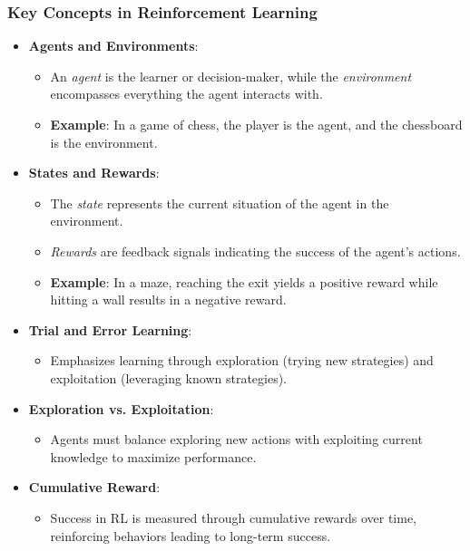 \documentclass{beamer}
\begin{document}
\begin{frame}[fragile]
    \frametitle{Key Concepts in Reinforcement Learning}
    \begin{itemize}
        \item \textbf{Agents and Environments}:
        \begin{itemize}
            \item An \textit{agent} is the learner or decision-maker, while the \textit{environment} encompasses everything the agent interacts with.
            \item \textbf{Example}: In a game of chess, the player is the agent, and the chessboard is the environment.
        \end{itemize}
        
        \item \textbf{States and Rewards}:
        \begin{itemize}
            \item The \textit{state} represents the current situation of the agent in the environment.
            \item \textit{Rewards} are feedback signals indicating the success of the agent's actions.
            \item \textbf{Example}: In a maze, reaching the exit yields a positive reward while hitting a wall results in a negative reward.
        \end{itemize}
        
        \item \textbf{Trial and Error Learning}:
        \begin{itemize}
            \item Emphasizes learning through exploration (trying new strategies) and exploitation (leveraging known strategies).
        \end{itemize}

        \item \textbf{Exploration vs. Exploitation}:
        \begin{itemize}
            \item Agents must balance exploring new actions with exploiting current knowledge to maximize performance.
        \end{itemize}

        \item \textbf{Cumulative Reward}:
        \begin{itemize}
            \item Success in RL is measured through cumulative rewards over time, reinforcing behaviors leading to long-term success.
        \end{itemize}
    \end{itemize}
\end{frame}
\end{document}
